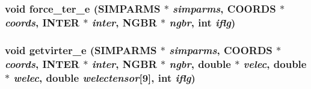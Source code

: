 \subsubsection{\setlength{\rightskip}{0pt plus 5cm}void force\_\-ter\_\-e ({\bf SIMPARMS} $\ast$ {\em simparms}, {\bf COORDS} $\ast$ {\em coords}, {\bf INTER} $\ast$ {\em inter}, {\bf NGBR} $\ast$ {\em ngbr}, int {\em iflg})}\label{md__finter__e_8c_3fa0cfb7f0b86fa3215f4e203b09ff0e}


\subsubsection{\setlength{\rightskip}{0pt plus 5cm}void getvirter\_\-e ({\bf SIMPARMS} $\ast$ {\em simparms}, {\bf COORDS} $\ast$ {\em coords}, {\bf INTER} $\ast$ {\em inter}, {\bf NGBR} $\ast$ {\em ngbr}, double $\ast$ {\em velec}, double $\ast$ {\em welec}, double {\em welectensor}[9], int {\em iflg})}\label{md__finter__e_8c_8b0cb7d2cacb0423b336365e96fc8e6b}


